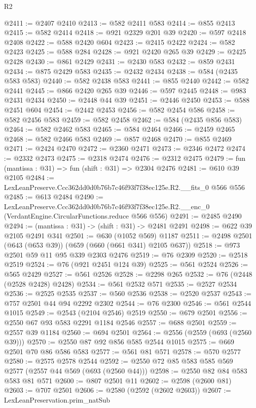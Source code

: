 \begin{lexlean}{R2}
\begin{coremodule}
@2411 := @2407 @2410
@2413 := @582 @2411 @583
@2414 := @855 @2413
@2415 := @582 @2414
@2418 := @921 @2329 @201 @39
@2420 := @597 @2418 @2408
@2422 := @588 @2420 @604
@2423 := @2415 @2422
@2424 := @582 @2423
@2425 := @588 @284
@2428 := @921 @2420 @265 @39
@2429 := @2425 @2428
@2430 := @861 @2429
@2431 := @2430 @583
@2432 := @859 @2431
@2434 := @875 @2429 @583
@2435 := @2432 @2434
@2438 := @584 (@2435 @583 @583)
@2440 := @582 @2438 @583
@2441 := @855 @2440
@2442 := @582 @2441
@2445 := @866 @2420 @265 @39
@2446 := @597 @2445
@2448 := @983 @2431 @2434
@2450 := @2448 @44 @39
@2451 := @2446 @2450
@2453 := @588 @2451 @604
@2454 := @2442 @2453
@2456 := @582 @2454 @586
@2458 := @582 @2456 @583
@2459 := @582 @2458
@2462 := @584 (@2435 @856 @583)
@2464 := @582 @2462 @583
@2465 := @584 @2464
@2466 := @2459 @2465
@2468 := @582 @2466 @583
@2469 := @857 @2468
@2470 := @855 @2469
@2471 := @2424 @2470
@2472 := @2360 @2471
@2473 := @2346 @2472
@2474 := @2332 @2473
@2475 := @2318 @2474
@2476 := @2312 @2475
@2479 := fun (mantissa : @31) => fun (shift : @31) => @2304 @2476
@2481 := @610 @39 @2105
@2484 := LexLeanPreserve.Ccc362dd0d0b76b7c46f93f7f38ec125e.R2.__fits_0 @566 @556
@2485 := @613 @2484
@2490 := LexLeanPreserve.Ccc362dd0d0b76b7c46f93f7f38ec125e.R2.__enc_0
    (VerdantEngine.CircularFunctions.reduce @566 @556)
@2491 := @2485 @2490
@2494 := (mantissa : @31) -> (shift : @31) -> @2481 @2491
@2498 := @622 @39 @2105 @2491 @341
@2501 := @630 (@1052 @569) @1187
@2511 := @2498 @2501 (@643 (@653 @39)) (@659 (@660 (@661 @341) @2105 @637))
@2518 := @973 @2501 @59 @11 @95 @339 @2303 @2476
@2519 := @76 @2309
@2520 := @2518 @2519
@2524 := @76 (@921 @2451 @124 @39)
@2525 := @561 @2524
@2526 := @565 @2429
@2527 := @561 @2526
@2528 := @2298 @265
@2532 := @76 (@2448 (@2528 @2428) @2428)
@2534 := @561 @2532 @571
@2535 := @2527 @2534
@2536 := @2525 @2535
@2537 := @560 @2536
@2538 := @2520 @2537
@2543 := @757 @2501 @44 @94 @2292 @2302
@2544 := @76 @2300
@2546 := @561 @2544 @1015
@2549 := @2543 (@2104 @2546) @2519
@2550 := @679 @2501
@2556 := @2550 @67 @93 @583 @2291 @1184 @2546
@2557 := @688 @2501
@2559 := @2557 @39 @1184
@2560 := @694 @2501
@2564 := @2556 (@2559 (@693 (@2560 @39)))
@2570 := @2550 @87 @92 @856 @585 @2544 @1015
@2575 := @669 @2501 @70 @86 @586 @583
@2577 := @561 @81 @571
@2578 := @570 @2577
@2580 := @2575 @2578 @2544
@2592 := @2550 @72 @85 @583 @585 @569 @2577 (@2557 @44 @569 (@693 (@2560 @44)))
@2598 := @2550 @82 @84 @583 @583 @81 @571
@2600 := @807 @2501 @11
@2602 := @2598 (@2600 @81)
@2603 := @707 @2501
@2606 := @2580 (@2592 (@2602 @2603))
@2607 := LexLeanPreservation.prim_natSub

\end{coremodule}
\end{lexlean}
